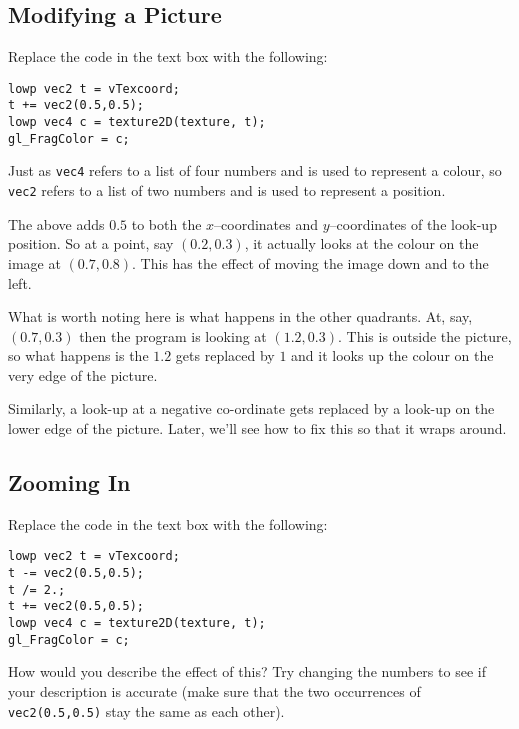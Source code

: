 \documentclass[
  html5,%
  mathml,%
  use filename%
]{internet}
\begin{document}
\subsection{Modifying a Picture}
\label{sec:modify}

Replace the code in the text box with the following:

\begin{tcolorbox}
\begin{verbatim}
lowp vec2 t = vTexcoord;
t += vec2(0.5,0.5);
lowp vec4 c = texture2D(texture, t);
gl_FragColor = c;
\end{verbatim}
\end{tcolorbox}

Just as \verb+vec4+ refers to a list of four numbers and is used to represent a colour, so \verb+vec2+ refers to a list of two numbers and is used to represent a position.

The above adds \(0.5\) to both the \(x\)--coordinates and \(y\)--coordinates of the look-up position.
So at a point, say \((0.2,0.3)\), it actually looks at the colour on the image at \((0.7,0.8)\).
This has the effect of moving the image down and to the left.

What is worth noting here is what happens in the other quadrants.
At, say, \((0.7,0.3)\) then the program is looking at \((1.2,0.3)\).
This is outside the picture, so what happens is the \(1.2\) gets replaced by \(1\) and it looks up the colour on the very edge of the picture.

Similarly, a look-up at a negative co-ordinate gets replaced by a look-up on the lower edge of the picture.
Later, we'll see how to fix this so that it wraps around.

\subsection{Zooming In}

Replace the code in the text box with the following:

\begin{tcolorbox}
\begin{verbatim}
lowp vec2 t = vTexcoord;
t -= vec2(0.5,0.5);
t /= 2.;
t += vec2(0.5,0.5);
lowp vec4 c = texture2D(texture, t);
gl_FragColor = c;
\end{verbatim}
\end{tcolorbox}

How would you describe the effect of this?
Try changing the numbers to see if your description is accurate (make sure that the two occurrences of \verb+vec2(0.5,0.5)+ stay the same as each other).
\end{document}

